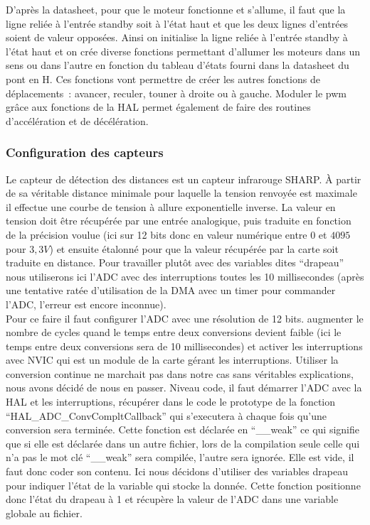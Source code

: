 \documentclass{article}
\begin{document}
D'après la datasheet, pour que le moteur fonctionne et s'allume, il faut que la ligne reliée à l'entrée standby soit à l'état haut et que les deux lignes d'entrées soient de valeur opposées. Ainsi on initialise la ligne reliée à l'entrée standby à l'état haut et on crée diverse fonctions permettant d'allumer les moteurs dans un sens ou dans l'autre en fonction du tableau d'états fourni dans la datasheet du pont en H. Ces fonctions vont permettre de créer les autres fonctions de déplacements~: avancer, reculer, touner à droite ou à gauche. Moduler le pwm grâce aux fonctions de la HAL permet également de faire des routines d'accélération et de décélération.

\subsubsection{Configuration des capteurs}

Le capteur de détection des distances est un capteur infrarouge SHARP. À partir de sa véritable distance minimale pour laquelle la tension renvoyée est maximale il effectue une courbe de tension à allure exponentielle inverse. La valeur en tension doit être récupérée par une entrée analogique, puis traduite en fonction de la précision voulue (ici sur 12 bits donc en valeur numérique entre $0$ et $4095$ pour $3,3V$) et ensuite étalonné pour que la valeur récupérée par la carte soit traduite en distance. Pour travailler plutôt avec des variables dites ``drapeau'' nous utiliserons ici l'ADC avec des interruptions toutes les 10 millisecondes (après une tentative ratée d'utilisation de la DMA avec un timer pour commander l'ADC, l'erreur est encore inconnue).\\

Pour ce faire il faut configurer l'ADC avec une résolution de 12 bits. augmenter le nombre de cycles quand le temps entre deux conversions devient faible (ici le temps entre deux conversions sera de 10 millisecondes) et activer les interruptions avec NVIC qui est un module de la carte gérant les interruptions. Utiliser la conversion continue ne marchait pas dans notre cas sans véritables explications, nous avons décidé de nous en passer. Niveau code, il faut démarrer l'ADC avec la HAL et les interruptions, récupérer dans le code le prototype de la fonction ``HAL\_ADC\_ConvCompltCallback'' qui s'executera à chaque fois qu'une conversion sera terminée. Cette fonction est déclarée en ``\_\_weak'' ce qui signifie que si elle est déclarée dans un autre fichier, lors de la compilation seule celle qui n'a pas le mot clé ``\_\_weak'' sera compilée, l'autre sera ignorée. Elle est vide, il faut donc coder son contenu. Ici nous décidons d'utiliser des variables drapeau pour indiquer l'état de la variable qui stocke la donnée. Cette fonction positionne donc l'état du drapeau à 1 et récupère la valeur de l'ADC dans une variable globale au fichier. \\
\end{document}
